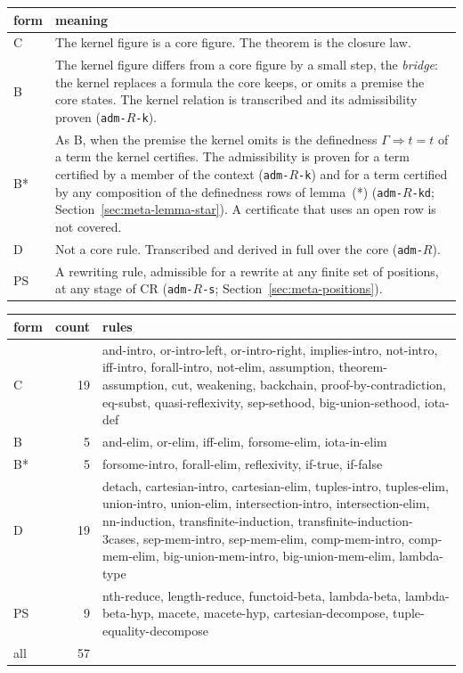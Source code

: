 \begin{center}
\small
\begin{tabular}{@{}lp{}@{}}
\toprule
form & meaning \\
\midrule
C & The kernel figure is a core figure.  The theorem is the closure law. \\
B & The kernel figure differs from a core figure by a small step, the
  \emph{bridge}: the kernel replaces a formula the core keeps, or omits a
  premise the core states.  The kernel relation is transcribed and its
  admissibility proven (\texttt{adm-}$R$\texttt{-k}). \\
B* & As B, when the premise the kernel omits is the definedness
  $\Gamma \Longrightarrow t = t$ of a term the kernel certifies.  The
  admissibility is proven for a term certified by a member of the context
  (\texttt{adm-}$R$\texttt{-k}) and for a term certified by any
  composition of the definedness rows of lemma~(*)
  (\texttt{adm-}$R$\texttt{-kd}; Section~\ref{sec:meta-lemma-star}).
  A certificate that uses an open row is not covered. \\
D & Not a core rule.  Transcribed and derived in full over the core
  (\texttt{adm-}$R$). \\
PS & A rewriting rule, admissible for a rewrite at any finite set of
  positions, at any stage of CR (\texttt{adm-}$R$\texttt{-s};
  Section~\ref{sec:meta-positions}). \\
\bottomrule
\end{tabular}
\end{center}

\begin{center}
\small
\begin{tabular}{@{}lrp{}@{}}
\toprule
form & count & rules \\
\midrule
C & 19 & and-intro, or-intro-left, or-intro-right, implies-intro,
  not-intro, iff-intro, forall-intro, not-elim, assumption,
  theorem-assumption, cut, weakening, backchain, proof-by-contradiction,
  eq-subst, quasi-reflexivity, sep-sethood, big-union-sethood, iota-def \\
B & 5 & and-elim, or-elim, iff-elim, forsome-elim, iota-in-elim \\
B* & 5 & forsome-intro, forall-elim, reflexivity, if-true, if-false \\
D & 19 & detach, cartesian-intro, cartesian-elim, tuples-intro,
  tuples-elim, union-intro, union-elim, intersection-intro,
  intersection-elim, nn-induction, transfinite-induction,
  transfinite-induction-3cases, sep-mem-intro, sep-mem-elim,
  comp-mem-intro, comp-mem-elim, big-union-mem-intro, big-union-mem-elim,
  lambda-type \\
PS & 9 & nth-reduce, length-reduce, functoid-beta, lambda-beta,
  lambda-beta-hyp, macete, macete-hyp, cartesian-decompose,
  tuple-equality-decompose \\
\midrule
all & 57 & \\
\bottomrule
\end{tabular}
\end{center}

